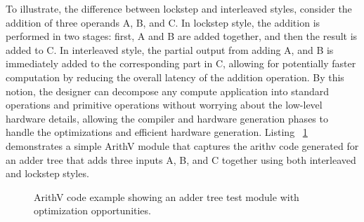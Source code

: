 To illustrate, the difference between lockstep and interleaved styles, consider the addition of three operands A, B, and C.
In lockstep style, the addition is performed in two stages: first, A and B are added together, and then the result is added to C.
In interleaved style, the partial output from adding A, and B is immediately added to the corresponding part in C, allowing for potentially faster computation by reducing the overall latency of the addition operation.
By this notion, the designer can decompose any compute application into standard operations and primitive operations without worrying about the low-level hardware details, allowing the compiler and hardware generation phases to handle the optimizations and efficient hardware generation.
Listing ~\ref{lst:addertree} demonstrates a simple ArithV module that captures the arithv code generated for an adder tree that adds three inputs A, B, and C together using both interleaved and lockstep styles.

\begin{figure}[t]
\centering
\resizebox{\columnwidth}{!}{%
\begin{minipage}{\textwidth}

\end{minipage}
}
\caption{ArithV code example showing an adder tree test module with optimization opportunities.}
\label{lst:addertree}
\end{figure}
























